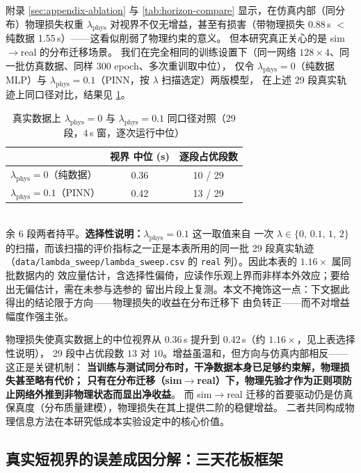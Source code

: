 \documentclass[a4paper,12pt]{ctexart}   %
\renewcommand{\emph}[1]{#1}
\begin{document}
附录 \cref{sec:appendix-ablation} 与 \cref{tab:horizon-compare} 显示，在仿真内部（同分布）物理损失权重 $\lambda_{\mathrm{phys}}$
对视界不仅无增益，甚至有损害（带物理损失 0.88\,s $<$ 纯数据 1.55\,s）——这看似削弱了物理约束的意义。
但本研究真正关心的是 sim$\to$real 的\emph{分布迁移}场景。
我们在完全相同的训练设置下（同一网络 $128\times4$、同一批仿真数据、同样 $300$ epoch、多次重训取中位），
仅令 $\lambda_{\mathrm{phys}}=0$（纯数据 MLP）与 $\lambda_{\mathrm{phys}}=0.1$（PINN，按 $\lambda$ 扫描选定）两版模型，
在上述 29 段真实轨迹上同口径对比，结果见 \cref{tab:real-lambda}。

\begin{table}[h]
\centering
\caption{真实数据上 $\lambda_{\mathrm{phys}}=0$ 与 $\lambda_{\mathrm{phys}}=0.1$ 同口径对照（29 段，$4$\,s 窗，逐次运行中位）}
\label{tab:real-lambda}
\begin{tabular}{lcc}
\toprule
 & 视界 中位 (s) & 逐段占优段数 \\
\midrule
$\lambda_{\mathrm{phys}}=0$（纯数据） & 0.36 & 10 / 29 \\
$\lambda_{\mathrm{phys}}=0.1$（PINN）  & 0.42 & 13 / 29 \\
\bottomrule
\end{tabular}
\\[0.5em]
{\footnotesize 余 6 段两者持平。\textbf{选择性说明：}$\lambda_{\mathrm{phys}} = 0.1$ 这一取值来自
一次 $\lambda \in \{0,\,0.1,\,1,\,2\}$ 的扫描，而该扫描的评价指标之一正是本表所用的同一批 29 段真实轨迹
（\texttt{data/lambda\_sweep/lambda\_sweep.csv} 的 \texttt{real} 列）。因此本表的 $1.16\times$ 属\emph{同批数据内}的
效应量估计，含选择性偏倚，应读作乐观上界而非样本外效应；要给出无偏估计，需在未参与选参的
留出片段上复测。本文不掩饰这一点：下文据此得出的结论限于\emph{方向}——物理损失的收益在分布迁移下
由负转正——而不对增益幅度作强主张。}
\end{table}

\noindent 物理损失使真实数据上的中位视界从 $0.36$\,s 提升到 $0.42$\,s（约 $1.16\times$，见上表选择性说明），
29 段中占优段数 $13$ 对 $10$。增益虽温和，但方向与仿真内部相反——这正是关键机制：
\textbf{当训练与测试同分布时，干净数据本身已足够约束解，物理损失甚至略有代价；
只有在分布迁移（sim$\to$real）下，物理先验才作为正则项防止网络外推到非物理状态而显出净收益}。
而 sim$\to$real 迁移的首要驱动仍是仿真保真度（分布质量建模），物理损失在其上提供二阶的稳健增益。
二者共同构成物理信息方法在本研究低成本实验设定中的核心价值。

\subsection{真实短视界的误差成因分解：三天花板框架}
\label{sec:sim2real-decomp}
\end{document}

